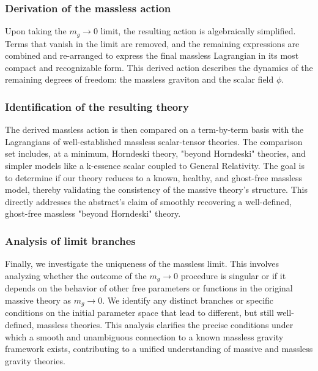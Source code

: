 \documentclass[twocolumn]{aastex631}
\begin{document}
\subsubsection{Derivation of the massless action}
Upon taking the $m_g \to 0$ limit, the resulting action is algebraically simplified. Terms that vanish in the limit are removed, and the remaining expressions are combined and re-arranged to express the final massless Lagrangian in its most compact and recognizable form. This derived action describes the dynamics of the remaining degrees of freedom: the massless graviton and the scalar field $\phi$.

\subsubsection{Identification of the resulting theory}
The derived massless action is then compared on a term-by-term basis with the Lagrangians of well-established massless scalar-tensor theories. The comparison set includes, at a minimum, Horndeski theory, "beyond Horndeski" theories, and simpler models like a k-essence scalar coupled to General Relativity. The goal is to determine if our theory reduces to a known, healthy, and ghost-free massless model, thereby validating the consistency of the massive theory's structure. This directly addresses the abstract's claim of smoothly recovering a well-defined, ghost-free massless "beyond Horndeski" theory.

\subsubsection{Analysis of limit branches}
Finally, we investigate the uniqueness of the massless limit. This involves analyzing whether the outcome of the $m_g \to 0$ procedure is singular or if it depends on the behavior of other free parameters or functions in the original massive theory as $m_g \to 0$. We identify any distinct branches or specific conditions on the initial parameter space that lead to different, but still well-defined, massless theories. This analysis clarifies the precise conditions under which a smooth and unambiguous connection to a known massless gravity framework exists, contributing to a unified understanding of massive and massless gravity theories.
\end{document}
